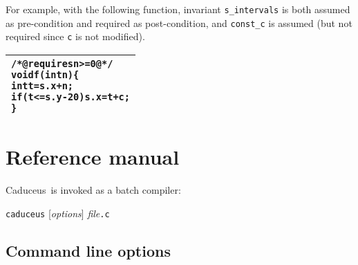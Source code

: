 \documentclass[12pt,a4paper,twoside,openright]{report}
\newcommand{\caduceus}{\textsf{Caduceus}}
\newenvironment{code}{\begin{small}\begin{alltt}%
\begin{tabular}{|p{0.97\textwidth}|}\hline%
}{\\\hline\end{tabular}\end{alltt}\end{small}}
\begin{document}
For example, with the following function, invariant
\texttt{s\_intervals} is both assumed as pre-condition and required as
post-condition, and \texttt{const\_c} is assumed (but not required
since \texttt{c} is not modified).
\begin{code}
/*@ requires n>=0 @*/
void f(int n) \{
  int t = s.x+n;
  if (t <= s.y - 20) s.x = t + c ;
\}
\end{code}



\chapter{Reference manual}
\label{refman}

\caduceus\ is invoked as a batch compiler:
\begin{center}
  \texttt{caduceus} [\textit{options}] \textit{file}\texttt{.c}
\end{center}

\section{Command line options}
\label{usage}
\end{document}
